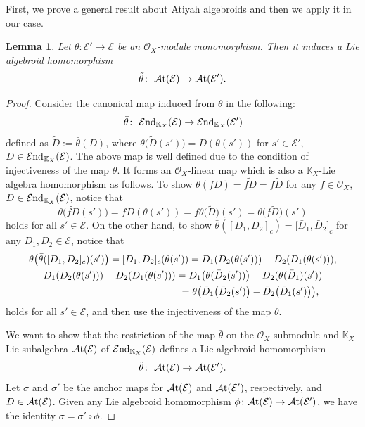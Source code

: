 \documentclass[pdftex]{sigma}
\numberwithin{equation}{section}
\newtheorem{Lem}[Thm]{Lemma}
\theoremstyle{definition}
\begin{document}
First, we prove a general result about Atiyah algebroids and then we apply it in our case.
\begin{Lem} \label{Lemma}
	Let $\theta\colon \mathcal{E}' \rightarrow \mathcal{E}$ be an $\mathcal{O}_X$-module monomorphism. Then it induces a Lie algebroid homomorphism
\[
\tilde{\theta}\colon \ \mathcal{A}{\rm t}(\mathcal{E}) \rightarrow \mathcal{A}{\rm t}(\mathcal{E}').
\]
\end{Lem}
\begin{proof}
	Consider the canonical map induced from $\theta$ in the following:
\[
\bar{\theta}\colon \ \mathcal{E}{\rm nd}_{\mathbb{K}_X}(\mathcal{E}) \rightarrow \mathcal{E}{\rm nd}_{\mathbb{K}_X}(\mathcal{E}')
\]
	defined as $\tilde{D}:=\bar{\theta}(D)$, where
	$\theta\bigl(\tilde{D}(s')\bigr)= D(\theta (s'))$ for $s' \in \mathcal{E}'$, $D \in \mathcal{E}{\rm nd}_{\mathbb{K}_X}(\mathcal{E})$. The above map is well defined due to the condition of injectiveness of the map $\theta$. It forms an $\mathcal{O}_X$-linear map which is also a $\mathbb{K}_X$-Lie algebra homomorphism as follows. To show $\bar{\theta}(f D)= \widetilde{fD}= f \tilde{D}$ for any $f \in \mathcal{O}_X$, $D \in \mathcal{E}{\rm nd}_{\mathbb{K}_X}(\mathcal{E})$, notice that
\[
\theta \bigl(\widetilde{fD}(s')\bigr)=fD(\theta(s'))=f \theta\bigl(\tilde{D}\bigr)(s')= \theta\bigl(f\tilde{D}\bigr)(s')
\]
	holds for all $s' \in \mathcal{E}$. On the other hand, to show $\bar{\theta}([D_1, D_2]_c)=\bigl[\bar{D}_1, \bar{D}_2\bigr]_c$ for any $D_1, D_2 \in \mathcal{E}$, notice that
\begin{gather*}
\theta\bigl(\bar{\theta} ([D_1, D_2]_c)(s')\bigr)= [D_1, D_2]_c(\theta(s'))=D_1(D_2(\theta(s')))- D_2(D_1(\theta(s'))),\\
D_1(D_2(\theta(s')))- D_2(D_1(\theta(s')))= D_1\bigl(\theta(\bar{D}_2(s'))\bigr)- D_2(\theta(\bar{D}_1)(s'))\\
\hphantom{D_1(D_2(\theta(s')))- D_2(D_1(\theta(s')))}{}
=\theta \bigl(\bar{D}_1 \bigl(\bar{D}_2(s')\bigr) - \bar{D}_2\bigl(\bar{D}_1(s')\bigr)\bigr),
\end{gather*}
	holds for all $s' \in \mathcal{E}$, and then use the injectiveness of the map $\theta$.
	
	
	We want to show that the restriction of the map $\bar{\theta}$ on the $\mathcal{O}_X$-submodule and $\mathbb{K}_X$-Lie subalgebra $\mathcal{A}{\rm t}(\mathcal{E})$ of $\mathcal{E}{\rm nd}_{\mathbb{K}_X}(\mathcal{E})$ defines a Lie algebroid homomorphism
\[
\tilde{\theta}\colon \ \mathcal{A}{\rm t}(\mathcal{E}) \rightarrow \mathcal{A}{\rm t}(\mathcal{E}').
\]
Let $\sigma$ and $\sigma'$ be the anchor maps for $\mathcal{A}{\rm t}(\mathcal{E})$ and $\mathcal{A}{\rm t}(\mathcal{E}')$, respectively, and $D \in \mathcal{A}{\rm t}(\mathcal{E})$. Given any Lie algebroid homomorphism $\phi\colon \mathcal{A}{\rm t}(\mathcal{E}) \rightarrow \mathcal{A}{\rm t}(\mathcal{E}')$, we have the identity $\sigma= \sigma' \circ \phi$.
	

\end{proof}
\end{document}
